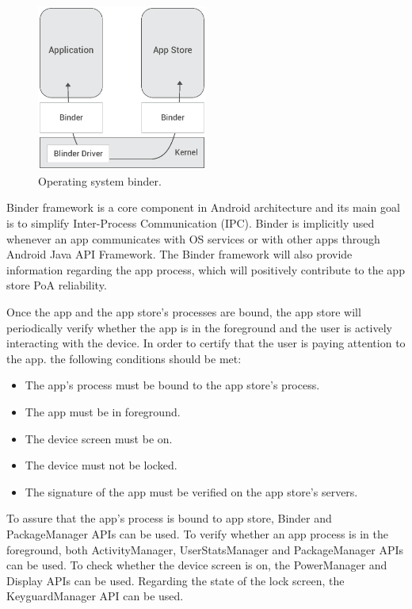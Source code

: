 \begin{figure}[!ht]
\centering
\includegraphics[width=0.5\textwidth]{diagrams/binder_diagram.eps}
\caption{Operating system binder.}
\label{fig:binder}
\end{figure}

Binder framework is a core component in Android architecture and its main goal is to simplify Inter-Process Communication (IPC). Binder is implicitly used whenever an app communicates with OS services or with other apps through Android Java API Framework. The Binder framework will also provide information regarding the app process, which will positively contribute to the app store \textsf{PoA} reliability.

Once the app and the app store's processes are bound, the app store will periodically verify whether the app is in the foreground and the user is actively interacting with the device. In order to certify that the user is paying attention to the app. the following conditions should be met:

\begin{itemize}
\item The app's process must be bound to the app store's process.
\item The app must be in foreground.
\item The device screen must be on.
\item The device must not be locked. 
\item The signature of the app must be verified on the app store's servers.
\end{itemize}

To assure that the app's process is bound to app store, Binder and PackageManager APIs can be used. To verify whether an app process is in the foreground, both ActivityManager, UserStatsManager and %
 PackageManager APIs can be used. To check whether the device screen is on, the PowerManager and Display APIs can be used. Regarding the state of the lock screen, the KeyguardManager API can be used. 

